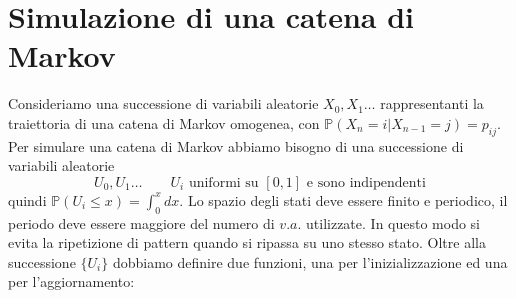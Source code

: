 \documentclass{article}
\theoremstyle{definition}
\theoremstyle{definition}
\theoremstyle{remark}
\begin{document}
\section{Simulazione di una catena di Markov}
Consideriamo una successione di variabili aleatorie $X_0,X_1\dots$ rappresentanti la traiettoria di una catena di Markov omogenea, con $\mathbb{P}(X_n = i| X_{n-1}= j) = p_{ij}$.
Per simulare una catena di Markov abbiamo bisogno di una successione di variabili aleatorie
$$U_0,U_1\dots\qquad  \text{$U_i$ uniformi su $[0,1]$ e sono indipendenti}$$
quindi $\mathbb{P}(U_i\le x) = \int_0^x dx$. Lo spazio degli stati deve essere finito e periodico,
il periodo deve essere maggiore del numero di $v.a.$ utilizzate. In questo modo si evita la ripetizione di pattern quando
si ripassa su uno stesso stato. Oltre alla successione $\{U_i\}$ dobbiamo definire due funzioni, una per l'inizializzazione
ed una per l'aggiornamento:
\end{document}

